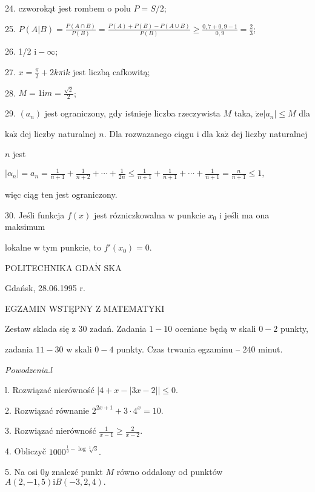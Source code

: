 \documentclass[a4paper,12pt]{article}
\begin{document}
24. czworokąt jest rombem o polu $P=S/2$;

25. $P(A|B)=\displaystyle \frac{P(A\cap B)}{P(B)}=\frac{P(A)+P(B)-P(A\cup B)}{P(B)}\geq\frac{0,7+0,9-1}{0,9}=\frac{2}{3}$;

26. 1/2 $\mathrm{i}-\infty$;

27. $x=\displaystyle \frac{\pi}{2}+2k\pi \mathrm{i}k$ jest liczbą cafkowitą;

28. $M=1\displaystyle \mathrm{i}m=\frac{\sqrt{2}}{2}$;

29. $(a_{n})$ jest ograniczony, gdy istnieje liczba rzeczywista $M$ taka, $\dot{\mathrm{z}}\mathrm{e} |a_{n}| \leq M$ dla

$\mathrm{k}\mathrm{a}\dot{\mathrm{z}}$ dej liczby naturalnej $n$. Dla rozwazanego ciągu i dla $\mathrm{k}\mathrm{a}\dot{\mathrm{z}}$ dej liczby naturalnej

$n$ jest

$|\displaystyle \alpha_{n}|=a_{n}=\frac{1}{n+1}+\frac{1}{n+2}+\cdots+\frac{1}{2n}\leq\frac{1}{n+1}+\frac{1}{n+1}+\cdots+\frac{1}{n+1}=\frac{n}{n+1}\leq 1,$

więc ciąg ten jest ograniczony.

30. Jeśli funkcja $f(x)$ jest rózniczkowalna w punkcie $x_{0}$ i jeśli ma ona maksimum

lokalne w tym punkcie, to $f'(x_{0})=0.$







POLITECHNIKA $\mathrm{G}\mathrm{D}\mathrm{A}\acute{\mathrm{N}}$ SKA

Gdańsk, 28.06.1995 r.

EGZAMIN WSTĘPNY Z MATEMATYKI

Zestaw sklada się z 30 zadań. Zadania $1-10$ oceniane będą w skali $0-2$ punkty,

zadania $11-30$ w skali $0-4$ punkty. Czas trwania egzaminu -- 240 minut.

{\it Powodzenia}.$l$

l. Rozwiązać nierówność $|4+x-|3x-2||\leq 0.$

2. Rozwiązać równanie $2^{2x+1}+3\cdot 4^{x}=10.$

3. Rozwiązać nierówność $\displaystyle \frac{1}{x-1}\geq\frac{2}{x-2}.$

4. Obliczyč $1000^{\frac{1}{3}-\log\sqrt[3]{3}}.$

5. Na osi $0y$ znalez$\acute{}$ć punkt $M$ równo oddalony od punktów $A(2,-1,5)\mathrm{i}B(-3,2,4).$
\end{document}
